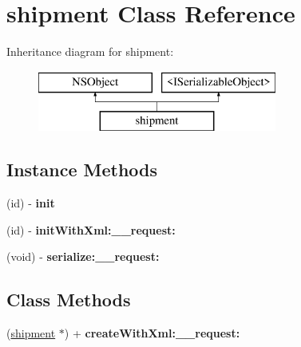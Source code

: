 \hypertarget{interfaceshipment}{}\section{shipment Class Reference}
\label{interfaceshipment}
Inheritance diagram for shipment\+:\begin{figure}[H]
\begin{center}
\leavevmode
\includegraphics[height=2.000000cm]{interfaceshipment}
\end{center}
\end{figure}
\subsection*{Instance Methods}
\begin{DoxyCompactItemize}
\item 
\hypertarget{interfaceshipment_a9e047f7b8b40851caa164fffaa2283bb}{}(id) -\/ {\bfseries init}\label{interfaceshipment_a9e047f7b8b40851caa164fffaa2283bb}

\item 
\hypertarget{interfaceshipment_ab36c017f5c7a4ec60604f5b4286882e4}{}(id) -\/ {\bfseries init\+With\+Xml\+:\+\_\+\+\_\+request\+:}\label{interfaceshipment_ab36c017f5c7a4ec60604f5b4286882e4}

\item 
\hypertarget{interfaceshipment_a73a4078009d00b8de677688018c77bb1}{}(void) -\/ {\bfseries serialize\+:\+\_\+\+\_\+request\+:}\label{interfaceshipment_a73a4078009d00b8de677688018c77bb1}

\end{DoxyCompactItemize}
\subsection*{Class Methods}
\begin{DoxyCompactItemize}
\item 
\hypertarget{interfaceshipment_a0536f8c214c3b97e5152d4a8e77f0774}{}(\hyperlink{interfaceshipment}{shipment} $\ast$) + {\bfseries create\+With\+Xml\+:\+\_\+\+\_\+request\+:}\label{interfaceshipment_a0536f8c214c3b97e5152d4a8e77f0774}

\end{DoxyCompactItemize}
